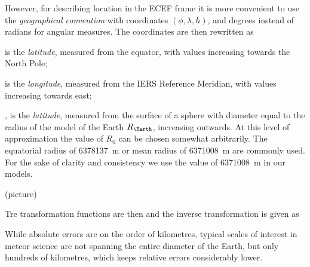         However, for describing location in the ECEF frame it is more convenient
        to use the \emph{geographical convention} with coordinates $(\phi, \lambda, h)$, and degrees
        instead of radians for angular measures. The coordinates are then rewritten as
        \begin{description}[leftmargin=40mm]
            \item[$\phi \in \IntervalCC{\ang{-90}}{\ang{+90}}$] is the \emph{latitude}, measured from the equator,
                with values increasing towards the North Pole;
            \item[$\lambda \in \IntervalCC{\ang{-180}}{\ang{+180}}$] is the \emph{longitude}, measured from the IERS Reference Meridian,
                with values increasing towards east;
            \item[$h \in \IntervalCC{-R_\Earth}{\infty}$], is the \emph{latitude}, measured from the surface of
                a sphere with diameter equal to the radius of the model of the Earth $R_\Earth$, increasing outwards.
                At this level of approximation the value of $R_0$ can be chosen somewhat arbitrarily.
                The equatorial radius of \SI{6378137}{\metre} or mean radius of \SI{6371008}{\metre} are commonly used.
                For the sake of clarity and consistency we use the value of \SI{6371008}{\metre} in our models.
        \end{description}

        (picture)

        Tre transformation functions are then
        and the inverse transformation is given as

        While absolute errors are on the order of kilometres, typical scales of interest
        in meteor science are not spanning the entire diameter of the Earth,
        but only hundreds of kilometres, which keeps relative errors considerably lower.

